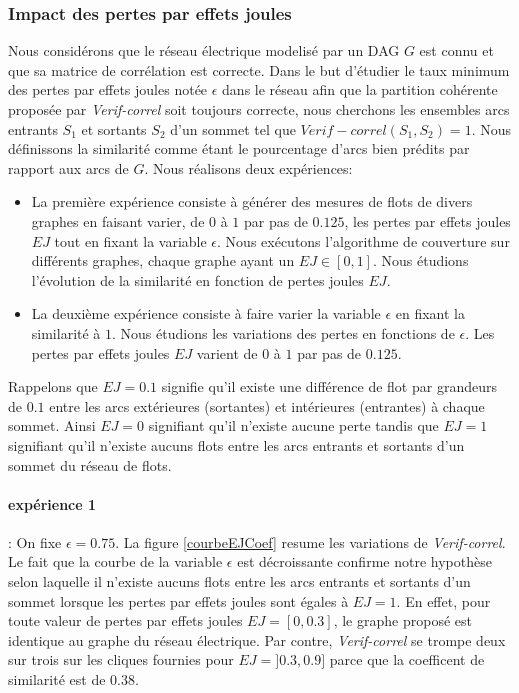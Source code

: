 \subsubsection{Impact des pertes par effets joules}
Nous consid\'erons que le r\'eseau \'electrique modelis\'e par un DAG $G$ est connu et que sa matrice de corr\'elation est correcte. 
Dans le but d'\'etudier le taux minimum des pertes par effets joules not\'ee $\epsilon$ dans le r\'eseau afin que la partition coh\'erente propos\'ee par  {\em Verif-correl} soit toujours correcte, 
nous cherchons les ensembles arcs entrants $S_1$ et sortants $S_2$ d'un sommet tel que $Verif-correl(S_1, S_2) = 1$.
Nous d\'efinissons la similarit\'e comme \'etant le pourcentage d'arcs bien pr\'edits par rapport aux arcs de $G$. 
Nous r\'ealisons deux exp\'eriences: 
\begin{itemize}
\item La premi\`ere exp\'erience consiste \`a g\'en\'erer des mesures de flots de divers graphes en faisant varier, de $0$ \`a $1$ par pas de $0.125$, les pertes par effets joules $EJ$ tout en fixant la variable $\epsilon$. Nous ex\'ecutons l'algorithme de couverture sur diff\'erents graphes, chaque graphe ayant un $EJ \in [0,1]$. Nous \'etudions l'\'evolution de la  similarit\'e en fonction de pertes joules $EJ$. 

\item La deuxi\`eme exp\'erience consiste \`a faire varier la variable $\epsilon$ en fixant la similarit\'e \`a $1$.  Nous \'etudions les variations des pertes en fonctions de $\epsilon$.  Les pertes par effets joules $EJ$ varient  de $0$ \`a $1$ par pas de $0.125$. 

\end{itemize}
Rappelons que $EJ=0.1$ signifie qu'il existe une diff\'erence de flot par grandeurs de $0.1$ entre les arcs ext\'erieures (sortantes) et int\'erieures (entrantes) \`a chaque sommet. Ainsi $EJ=0$ signifiant qu'il n'existe aucune perte tandis que  $EJ=1$ signifiant qu'il n'existe aucuns flots entre les arcs entrants et sortants d'un sommet du r\'eseau de flots.
\paragraph{exp\'erience 1} :
On fixe  $\epsilon=0.75$. 
La figure \ref{courbeEJCoef} resume les variations de {\em Verif-correl}. 
Le fait que la courbe de la variable $\epsilon$ est d\'ecroissante confirme notre hypoth\`ese selon laquelle il n'existe aucuns flots entre les arcs entrants et sortants d'un sommet lorsque les pertes par effets joules sont \'egales \`a $EJ = 1$. En effet, pour toute valeur de pertes par effets joules  $EJ=[0,0.3]$, le graphe propos\'e est identique au graphe du r\'eseau \'electrique. Par contre, {\em Verif-correl} se trompe deux sur trois sur les cliques fournies pour $EJ = ]0.3,0.9]$ parce que la coefficent de similarit\'e est de $0.38$. 

